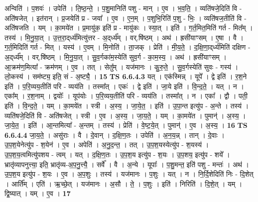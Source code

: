 \documentclass[17pt]{extarticle}
\begin{document}
                  अन्विति॑ । प॒शवः॑ । उपेति॑ । ति॒ष्ठ॒न्ते॒ । प॒शु॒मानिति॑ पशु - मान् । ए॒व । भ॒व॒ति॒ । व्यति॑षजे॒दिति॑ वि - अति॑षजेत् । इत॑रान् । प्र॒जयेति॑ प्र - जया᳚ । ए॒व । ए॒न॒म् । प॒शुभि॒रिति॑ प॒शु - भिः॒ । व्यति॑षज॒तीति॑ वि - अति॑षजति । यम् । का॒मये॑त । प्र॒मायु॑क॒ इति॑ प्र - मायु॑कः । स्या॒त् । इति॑ । ग॒र्त॒मित॒मिति॑ गर्त - मित᳚म् । तस्य॑ । मि॒नु॒या॒त् । उ॒त्त॒रा॒द्‌र्ध्य॑मित्यु॑त्तर - अ॒द्‌र्ध्य᳚म् । वर्.षि॑ष्ठम् । अथ॑ । ह्रसी॑याꣳसम् । ए॒षा । वै । ग॒र्त॒मिदिति॑ गर्त - मित् । यस्य॑ । ए॒वम् । मि॒नोति॑ । ता॒जक् । प्रेति॑ । मी॒य॒ते॒ । द॒क्षि॒णा॒द्‌र्ध्य॑मिति॑ दक्षिण - अ॒द्‌र्ध्य᳚म् । वर्.षि॑ष्ठम् । मि॒नु॒या॒त् । सु॒व॒र्गका॑म॒स्येति॑ सुव॒र्ग - का॒म॒स्य॒ । अथ॑ । ह्रसी॑याꣳसम् । आ॒क्रम॑ण॒मित्या᳚ - क्रम॑णम् । ए॒व । तत् । सेतु᳚म् । यज॑मानः । कु॒रु॒ते॒ । सु॒व॒र्गस्येति॑ सुवः - गस्य॑ । लो॒कस्य॑ । सम॑ष्ट्य॒ इति॒ सं - अ॒ष्ट्यै॒ । \textbf{  15} \newline
                  \newline
                                \textbf{ TS 6.6.4.3} \newline
                  यत् । एक॑स्मिन्न् । यूपे᳚ । द्वे इति॑ । र॒श॒ने इति॑ । प॒रि॒व्यय॒तीति॑ परि - व्यय॑ति । तस्मा᳚त् । एकः॑ । द्वे इति॑ । जा॒ये इति॑ । वि॒न्द॒ते॒ । यत् । न । एका᳚म् । र॒श॒नाम् । द्वयोः᳚ । यूप॑योः । प॒रि॒व्यय॒तीति॑ परि - व्यय॑ति । तस्मा᳚त् । न । एका᳚ । द्वौ । पती॒ इति॑ । वि॒न्द॒ते॒ । यम् । का॒मये॑त । स्त्री । अ॒स्य॒ । जा॒ये॒त॒ । इति॑ । उ॒पा॒न्त इत्यु॑प - अ॒न्ते । तस्य॑ । व्यति॑षजे॒दिति॑ वि - अति॑षजेत् । स्त्री । ए॒व । अ॒स्य॒ । जा॒य॒ते॒ । यम् । का॒मये॑त । पुमान्॑ । अ॒स्य॒ । जा॒ये॒त॒ । इति॑ । आ॒न्तमित्या᳚ - अ॒न्तम् । तस्य॑ । प्रेति॑ । वे॒ष्ट॒ये॒त् । पुमान्॑ । ए॒व । अ॒स्य॒ । \textbf{  16} \newline
                  \newline
                                \textbf{ TS 6.6.4.4} \newline
                  जा॒य॒ते॒ । असु॑राः । वै । दे॒वान् । द॒क्षि॒ण॒तः । उपेति॑ । अ॒न॒य॒न्न् । तान् । दे॒वाः । उ॒प॒श॒येनेत्यु॑प - श॒येन॑ । ए॒व । अपेति॑ । अ॒नु॒द॒न्त॒ । तत् । उ॒प॒श॒यस्येत्यु॑प - श॒यस्य॑ । उ॒प॒श॒य॒त्वमित्यु॑पशय - त्वम् । यत् । द॒क्षि॒ण॒तः । उ॒प॒श॒य इत्यु॑प - श॒यः । उ॒प॒शय॒ इत्यु॑प - शये᳚ । भ्रातृ॑व्यापनुत्त्या॒ इति॒ भ्रातृ॑व्य-अ॒प॒नु॒त्त्यै॒ । सर्वे᳚ । वै । अ॒न्ये । यूपाः᳚ । प॒शु॒मन्त॒ इति॑ पशु - मन्तः॑ । अथ॑ । उ॒प॒श॒य इत्यु॑प - श॒यः । ए॒व । अ॒प॒शुः । तस्य॑ । यज॑मानः । प॒शुः । यत् । न । नि॒र्दि॒शेदिति॑ निः - दि॒शेत् । आर्ति᳚म् । एति॑ । ऋ॒च्छे॒त् । यज॑मानः । अ॒सौ । ते॒ । प॒शुः । इति॑ । निरिति॑ । दि॒शे॒त् । यम् । द्वि॒ष्यात् । यम् । ए॒व । \textbf{  17} \newline
\end{document}
